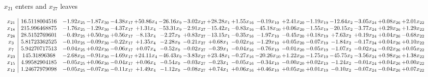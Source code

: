 \documentclass[9pt]{article}
\begin{document}
 $ x_{21} $ enters and $ x_{27} $ leaves 

 \[\begin{array}{c| c c@{\hskip 2pt} c@{\hskip 2pt} c@{\hskip 2pt} c@{\hskip 2pt} c@{\hskip 2pt} c@{\hskip 2pt} c@{\hskip 2pt} c@{\hskip 2pt} c@{\hskip 2pt} c@{\hskip 2pt} c@{\hskip 2pt} c@{\hskip 2pt} c@{\hskip 2pt} c@{\hskip 2pt} c@{\hskip 2pt} }
 x_{21}   &  16.5118004516 & -1.92 x_{25} & -1.87 x_{30} & -4.38 x_{17} & + 50.86 x_{4} & -26.16 x_{9} & -3.02 x_{27} & + 28.28 x_{1} & +  1.55 x_{16} & -0.19 x_{10} & +  2.41 x_{20} & -1.19 x_{19} & -12.64 x_{2} & -3.05 x_{24} & +  0.08 x_{26} & +  2.01 x_{22}\\
 x_{18}   &  215.996468875 & -1.76 x_{25} & -1.29 x_{30} & -4.37 x_{17} & +  1.31 x_{4} & -53.31 x_{9} & -2.91 x_{27} & -15.42 x_{1} & -0.83 x_{16} & -45.18 x_{10} & +  0.06 x_{20} & -1.55 x_{19} & -20.15 x_{2} & -3.77 x_{24} & +  0.29 x_{26} & +  1.29 x_{22}\\
 x_{28}   &  28.5152769601 & -0.49 x_{25} & +  0.50 x_{30} & +  0.56 x_{17} & -8.13 x_{4} & -2.27 x_{9} & +  0.83 x_{27} & -13.15 x_{1} & -0.35 x_{16} & -1.97 x_{10} & -0.45 x_{20} & +  0.18 x_{19} & +  7.63 x_{2} & +  0.19 x_{24} & +  0.04 x_{26} & -0.68 x_{22}\\
 x_{3}   &  5.81723362525 & -0.10 x_{25} & -0.09 x_{30} & -0.22 x_{17} & +  1.35 x_{4} & -2.28 x_{9} & -0.21 x_{27} & +  0.68 x_{1} & -0.02 x_{16} & -1.29 x_{10} & +  0.05 x_{20} & -0.07 x_{19} & -1.84 x_{2} & -0.17 x_{24} & +  0.04 x_{26} & +  0.10 x_{22}\\
 x_{7}   &  5.94270717513 & -0.04 x_{25} & +  0.02 x_{30} & -0.06 x_{17} & +  0.07 x_{4} & -0.52 x_{9} & -0.02 x_{27} & -0.39 x_{1} & -0.04 x_{16} & -0.76 x_{10} & -0.01 x_{20} & -0.05 x_{19} & -1.07 x_{2} & -0.02 x_{24} & -0.02 x_{26} & +  0.05 x_{22}\\
 x_{23}   &  145.31896368 & -2.68 x_{25} & -0.91 x_{30} & -4.69 x_{17} & + 24.11 x_{4} & -46.43 x_{9} & -3.83 x_{27} & + 23.48 x_{1} & -0.27 x_{16} & -20.26 x_{10} & +  1.22 x_{20} & -1.75 x_{19} & -45.75 x_{2} & -3.56 x_{24} & +  0.98 x_{26} & +  1.38 x_{22}\\
 x_{15}   &  4.99582904185 & -0.05 x_{25} & +  0.06 x_{30} & -0.04 x_{17} & +  0.06 x_{4} & -0.54 x_{9} & -0.03 x_{27} & -0.23 x_{1} & -0.05 x_{16} & -0.34 x_{10} & -0.00 x_{20} & +  0.02 x_{19} & -1.24 x_{2} & -0.01 x_{24} & +  0.04 x_{26} & +  0.00 x_{22}\\
 x_{12}   &  1.24677979098 & -0.05 x_{25} & -0.07 x_{30} & -0.11 x_{17} & +  1.49 x_{4} & -1.12 x_{9} & -0.08 x_{27} & +  0.74 x_{1} & +  0.06 x_{16} & +  0.46 x_{10} & +  0.05 x_{20} & +  0.01 x_{19} & -0.10 x_{2} & -0.07 x_{24} & -0.04 x_{26} & +  0.07 x_{22}\\

\end{array}\]
\end{document}
